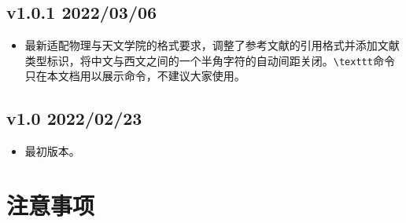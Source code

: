 
\subsection*{v1.0.1 2022/03/06}

\begin{itemize}
    \item 最新适配物理与天文学院的格式要求，调整了参考文献的引用格式并添加文献类型标识，将中文与西文之间的一个半角字符的自动间距关闭。\texttt{\textbackslash texttt}命令只在本文档用以展示命令，不建议大家使用。
\end{itemize}

\subsection*{v1.0 2022/02/23}

\begin{itemize}
    \item 最初版本。
\end{itemize}


\section{注意事项}

